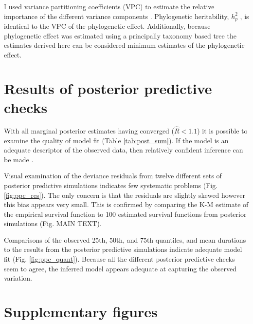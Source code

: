 \documentclass{article}
\begin{document}
I used variance partitioning coefficients (VPC) to estimate the relative importance of the different variance components \cite{Gelman2007}. Phylogenetic heritability, \(h_{p}^{2}\) \cite{Lynch1991,Housworth2004}, is identical to the VPC of the phylogenetic effect. Additionally, because phylogenetic effect was estimated using a principally taxonomy based tree the estimates derived here can be considered minimum estimates of the phylogenetic effect.


\section{Results of posterior predictive checks}
With all marginal posterior estimates having converged (\(\hat{R} < 1.1\)) it is possible to examine the quality of model fit (Table \ref{tab:post_sum}). If the model is an adequate descriptor of the observed data, then relatively confident inference can be made \cite{Gelman2013d}.

Visual examination of the deviance residuals from twelve different sets of posterior predictive simulations indicates few systematic problems (Fig. \ref{fig:ppc_res}). The only concern is that the residuals are slightly skewed however this bias appears very small. This is confirmed by comparing the K-M estimate of the empirical survival function to 100 estimated survival functions from posterior simulations (Fig. MAIN TEXT).

Comparisons of the observed 25th, 50th, and 75th quantiles, and mean durations to the results from the posterior predictive simulations indicate adequate model fit (Fig. \ref{fig:ppc_quant}). Because all the different posterior predictive checks seem to agree, the inferred model appears adequate at capturing the observed variation.



\clearpage

\section{Supplementary figures}
\end{document}
